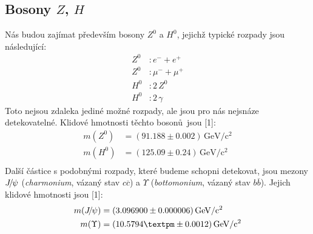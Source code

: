 \documentclass[10pt,a4paper]{article}
\renewcommand{\U}[1]{\ensuremath{\,\mathrm{#1}}}
\newcommand{\°}{\degree}
\newcommand{\Jpsi}{\ensuremath{J \hspace{-2pt} / \hspace{-1pt} \psi}}
\begin{document}
\subsection{Bosony \texorpdfstring{$Z$, $H$}{Z, H}}
Nás budou zajímat především bosony $Z^0$ a $H^0$, jejichž typické rozpady jsou následující:
\begin{align*}
    Z^0 &: e^- + e^+ \\
    Z^0 &: \mu^- + \mu^+ \\
    H^0 &: 2 \, Z^0 \\
    H^0 &: 2 \, \gamma
\end{align*}
Toto nejsou zdaleka jediné možné rozpady, ale jsou pro nás nejsnáze detekovatelné. Klidové hmotnosti těchto bosonů~jsou [1]:
\begin{align*}
    m(Z^0) &= (91.188 \pm 0.002) \U{GeV/c^2} \\
    m(H^0) &= (125.09 \pm 0.24) \U{GeV/c^2} \\
\end{align*}
Další částice s podobnými rozpady, které budeme schopni detekovat, jsou mezony $\Jpsi$ (\textit{charmonium}, vázaný stav $c\overline c$) a $\Upsilon$ (\textit{bottomonium}, vázaný stav $b\overline b$). Jejich klidové hmotnosti jsou [1]:
\begin{align*}
    m(\Jpsi) &= (3.096900 \pm 0.000006) \U{GeV/c^2} \\
    m(\Upsilon) &= (10.5794± \pm 0.0012) \U{GeV/c^2} \\
\end{align*}
\end{document}
